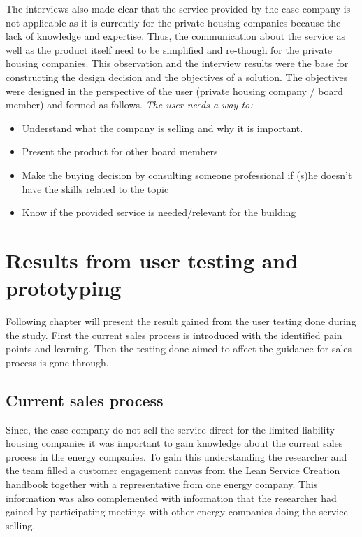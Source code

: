 The interviews also made clear that the service provided by the case company is not applicable as it is currently for the private housing companies because the lack of knowledge and expertise. Thus, the communication about the service  as well as the product itself need to be simplified and re-though for the private housing companies. This observation and the interview results were the base for constructing the design decision and the objectives of a solution. The objectives were designed in the perspective of the user (private housing company / board member) and formed as follows. \emph{The user needs a way to:}
\begin{itemize}
\item Understand what the company is selling and why it is important.
\item Present the product for other board members
\item Make the buying decision by consulting someone professional if (s)he doesn't have the skills related to the topic
\item Know if the provided service is needed/relevant for the building
\end{itemize}

\section{Results from user testing and prototyping}

Following chapter will present the result gained from the user testing done during the study. First the current sales process is introduced with the identified pain points and learning. Then the testing done aimed to affect the guidance for sales process is gone through.

\subsection{Current sales process}

Since, the case company do not sell the service direct for the limited liability housing companies it was important to gain knowledge about the current sales process in the energy companies. To gain this understanding the researcher and the team filled a customer engagement canvas from the Lean Service Creation handbook together with a representative from one energy company. This information was also complemented with information that the researcher had gained by participating meetings with other energy companies doing the service selling.

